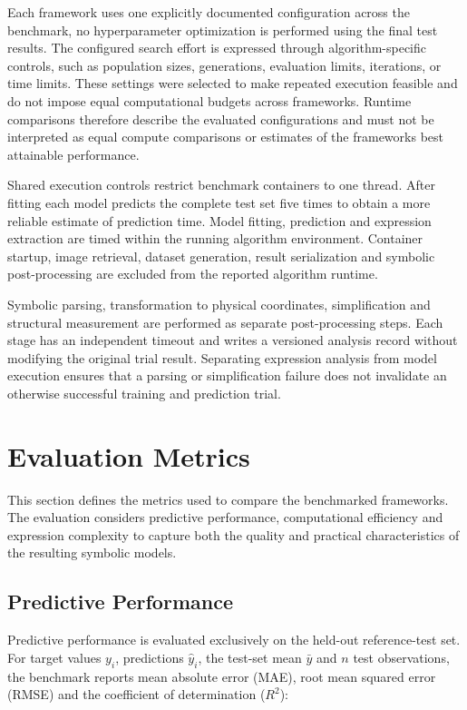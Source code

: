 \documentclass[12pt,oneside,bibtotoc,liststotoc]{scrbook}
\begin{document}
Each framework uses one explicitly documented configuration across the benchmark, no hyperparameter optimization is performed using the final test results. The configured search effort is expressed through algorithm-specific controls, such as population sizes, generations, evaluation limits, iterations, or time limits. These settings were selected to make repeated execution feasible and do not impose equal computational budgets across frameworks. Runtime comparisons therefore describe the evaluated configurations and must not be interpreted as equal compute comparisons or estimates of the frameworks best attainable performance.

Shared execution controls restrict benchmark containers to one thread. After fitting each model predicts the complete test set five times to obtain a more reliable estimate of prediction time. Model fitting, prediction and expression extraction are timed within the running algorithm environment. Container startup, image retrieval, dataset generation, result serialization and symbolic post-processing are excluded from the reported algorithm runtime.

Symbolic parsing, transformation to physical coordinates, simplification and structural measurement are performed as separate post-processing steps. Each stage has an independent timeout and writes a versioned analysis record without modifying the original trial result. Separating expression analysis from model execution ensures that a parsing or simplification failure does not invalidate an otherwise successful training and prediction trial.

\section{Evaluation Metrics}

This section defines the metrics used to compare the benchmarked frameworks. The evaluation considers predictive performance, computational efficiency and expression complexity to capture both the quality and practical characteristics of the resulting symbolic models.

\subsection{Predictive Performance}

Predictive performance is evaluated exclusively on the held-out reference-test set. For target values $y_i$, predictions $\hat{y}_i$, the test-set mean $\bar{y}$ and $n$ test observations, the benchmark reports mean absolute error (MAE), root mean squared error (RMSE) and the coefficient of determination ($R^2$):
\end{document}
